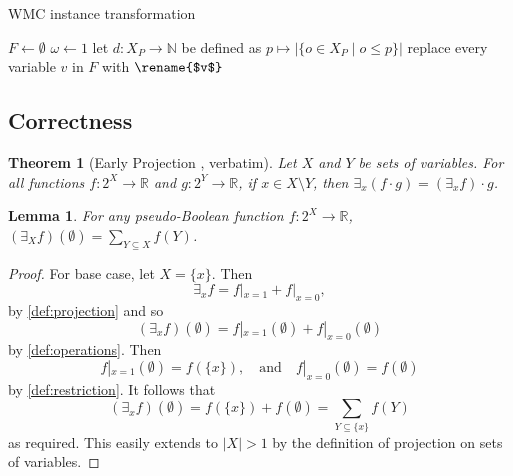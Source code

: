 \documentclass{article}
\newtheorem{theorem}{Theorem}
\newtheorem{lemma}{Lemma}
\theoremstyle{definition}
\theoremstyle{remark}
\begin{document}
\begin{algorithm}
  \caption{WMC instance transformation}
  \label{alg:transformation}
  $F \gets \emptyset$\;
  $\omega \gets 1$\;
  let $d\colon X_P \to \mathbb{N}$ be defined as $p \mapsto |\{ o \in X_P \mid o
  \le p \}|$\;
  replace every variable $v$ in $F$ with $\rename{$v$}$\;
  \;
\end{algorithm}

\subsection{Correctness}

\begin{theorem}[Early Projection
  \cite{DBLP:conf/aaai/DudekPV20,DBLP:conf/cp/DudekPV20},
  verbatim] \label{thm:early}
  Let $X$ and $Y$ be sets of variables. For all functions $f\colon 2^X \to
  \mathbb{R}$ and $g\colon 2^Y \to \mathbb{R}$, if $x \in X \setminus Y$, then
  $\exists_x (f \cdot g) = (\exists_x f) \cdot g$.
\end{theorem}

\begin{lemma} \label{lemma:sum}
  For any pseudo-Boolean function $f\colon 2^X \to \mathbb{R}$, $(\exists_X
  f)(\emptyset) = \sum_{Y \subseteq X} f(Y)$.
\end{lemma}
\begin{proof}
  For base case, let $X = \{x\}$. Then
  \[
    \exists_xf = f|_{x=1} + f|_{x=0},
  \]
  by \cref{def:projection} and so
  \[
    (\exists_xf)(\emptyset) = f|_{x=1}(\emptyset) + f|_{x=0}(\emptyset)
  \]
  by \cref{def:operations}. Then
  \[
    f|_{x=1}(\emptyset) = f(\{x\}), \quad \text{and} \quad f|_{x=0}(\emptyset) =
    f(\emptyset)
  \]
  by \cref{def:restriction}. It follows that
  \[
    (\exists_xf)(\emptyset) = f(\{x\}) + f(\emptyset) = \sum_{Y \subseteq \{x\}}
    f(Y)
  \]
  as required. This easily extends to $|X| > 1$ by the definition of projection
  on sets of variables. %
\end{proof}
\end{document}
